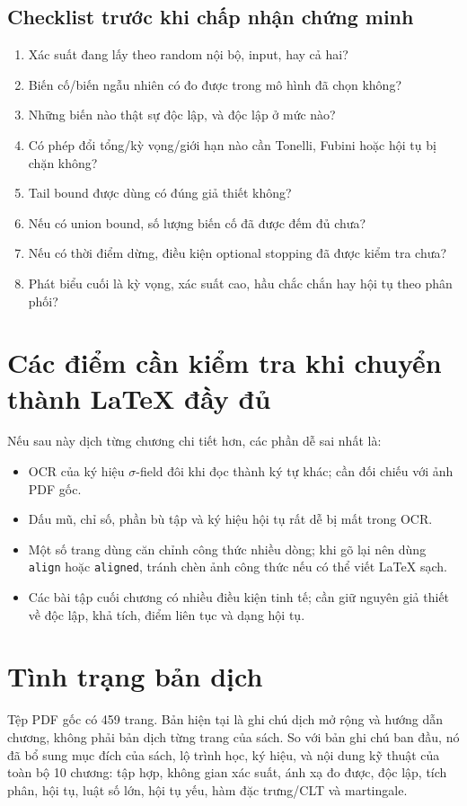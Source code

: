 \documentclass[11pt]{article}
\begin{document}
\subsection{Checklist trước khi chấp nhận chứng minh}

\begin{enumerate}
  \item Xác suất đang lấy theo random nội bộ, input, hay cả hai?
  \item Biến cố/biến ngẫu nhiên có đo được trong mô hình đã chọn không?
  \item Những biến nào thật sự độc lập, và độc lập ở mức nào?
  \item Có phép đổi tổng/kỳ vọng/giới hạn nào cần Tonelli, Fubini hoặc hội tụ
        bị chặn không?
  \item Tail bound được dùng có đúng giả thiết không?
  \item Nếu có union bound, số lượng biến cố đã được đếm đủ chưa?
  \item Nếu có thời điểm dừng, điều kiện optional stopping đã được kiểm tra
        chưa?
  \item Phát biểu cuối là kỳ vọng, xác suất cao, hầu chắc chắn hay hội tụ theo
        phân phối?
\end{enumerate}

\section{Các điểm cần kiểm tra khi chuyển thành LaTeX đầy đủ}

Nếu sau này dịch từng chương chi tiết hơn, các phần dễ sai nhất là:
\begin{itemize}
  \item OCR của ký hiệu \(\sigma\)-field đôi khi đọc thành ký tự khác; cần đối
        chiếu với ảnh PDF gốc.
  \item Dấu mũ, chỉ số, phần bù tập và ký hiệu hội tụ rất dễ bị mất trong OCR.
  \item Một số trang dùng căn chỉnh công thức nhiều dòng; khi gõ lại nên dùng
        \texttt{align} hoặc \texttt{aligned}, tránh chèn ảnh công thức nếu có
        thể viết LaTeX sạch.
  \item Các bài tập cuối chương có nhiều điều kiện tinh tế; cần giữ nguyên
        giả thiết về độc lập, khả tích, điểm liên tục và dạng hội tụ.
\end{itemize}

\section{Tình trạng bản dịch}

Tệp PDF gốc có 459 trang. Bản hiện tại là ghi chú dịch mở rộng và hướng dẫn
chương, không phải bản dịch từng trang của sách. So với bản ghi chú ban đầu,
nó đã bổ sung mục đích của sách, lộ trình học, ký hiệu, và nội dung kỹ thuật
của toàn bộ 10 chương: tập hợp, không gian xác suất, ánh xạ đo được, độc lập,
tích phân, hội tụ, luật số lớn, hội tụ yếu, hàm đặc trưng/CLT và martingale.
\end{document}
